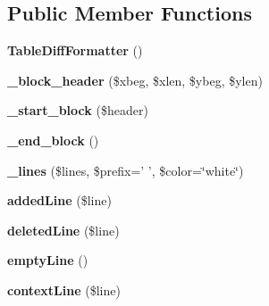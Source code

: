 \subsection*{Public Member Functions}
\begin{CompactItemize}
\item 
\hypertarget{classTableDiffFormatter_d77a551cea74846dd1efe78059fc797a}{
\textbf{TableDiffFormatter} ()}
\label{classTableDiffFormatter_d77a551cea74846dd1efe78059fc797a}

\item 
\hypertarget{classTableDiffFormatter_3f7dd379b5f51bb71701a1de17205375}{
\textbf{\_\-block\_\-header} (\$xbeg, \$xlen, \$ybeg, \$ylen)}
\label{classTableDiffFormatter_3f7dd379b5f51bb71701a1de17205375}

\item 
\hypertarget{classTableDiffFormatter_2971e39b4589b4cace5935aa255a648c}{
\textbf{\_\-start\_\-block} (\$header)}
\label{classTableDiffFormatter_2971e39b4589b4cace5935aa255a648c}

\item 
\hypertarget{classTableDiffFormatter_dfe410f4a49c971c81ccf7174f1d451e}{
\textbf{\_\-end\_\-block} ()}
\label{classTableDiffFormatter_dfe410f4a49c971c81ccf7174f1d451e}

\item 
\hypertarget{classTableDiffFormatter_28bb7b93fd73ada25a43ab8ebb35fb49}{
\textbf{\_\-lines} (\$lines, \$prefix=' ', \$color=\char`\"{}white\char`\"{})}
\label{classTableDiffFormatter_28bb7b93fd73ada25a43ab8ebb35fb49}

\item 
\hypertarget{classTableDiffFormatter_c02f783b15226591f43ba0c989526642}{
\textbf{addedLine} (\$line)}
\label{classTableDiffFormatter_c02f783b15226591f43ba0c989526642}

\item 
\hypertarget{classTableDiffFormatter_0d1de31fd7daa9a1f99fe7f2017a419a}{
\textbf{deletedLine} (\$line)}
\label{classTableDiffFormatter_0d1de31fd7daa9a1f99fe7f2017a419a}

\item 
\hypertarget{classTableDiffFormatter_6f66e3c17c3e7b34ff82a645f00212bf}{
\textbf{emptyLine} ()}
\label{classTableDiffFormatter_6f66e3c17c3e7b34ff82a645f00212bf}

\item 
\hypertarget{classTableDiffFormatter_0f807e2398484854e23ad25345ab0e1a}{
\textbf{contextLine} (\$line)}
\label{classTableDiffFormatter_0f807e2398484854e23ad25345ab0e1a}


\end{CompactItemize}
